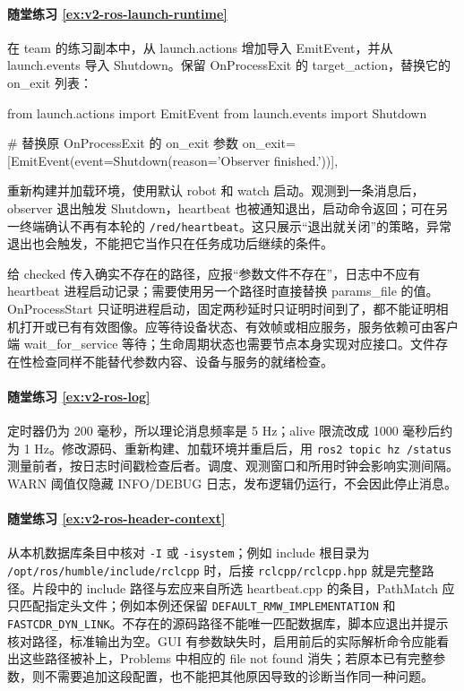 \paragraph*{随堂练习 \ref{ex:v2-ros-launch-runtime}}
\begin{solution}
在 team 的练习副本中，从 launch.actions 增加导入 EmitEvent，并从 launch.events 导入 Shutdown。保留 OnProcessExit 的 target\_action，替换它的 on\_exit 列表：
\begin{tpython}
from launch.actions import EmitEvent
from launch.events import Shutdown

# 替换原 OnProcessExit 的 on_exit 参数
on_exit=[EmitEvent(event=Shutdown(reason='Observer finished.'))],
\end{tpython}
重新构建并加载环境，使用默认 robot 和 watch 启动。观测到一条消息后，observer 退出触发 Shutdown，heartbeat 也被通知退出，启动命令返回；可在另一终端确认不再有本轮的 \texttt{/red/heartbeat}。这只展示“退出就关闭”的策略，异常退出也会触发，不能把它当作只在任务成功后继续的条件。

给 checked 传入确实不存在的路径，应报“参数文件不存在”，日志中不应有 heartbeat 进程启动记录；需要使用另一个路径时直接替换 params\_file 的值。OnProcessStart 只证明进程启动，固定两秒延时只证明时间到了，都不能证明相机打开或已有有效图像。应等待设备状态、有效帧或相应服务，服务依赖可由客户端 wait\_for\_service 等待；生命周期状态也需要节点本身实现对应接口。文件存在性检查同样不能替代参数内容、设备与服务的就绪检查。
\end{solution}

\paragraph*{随堂练习 \ref{ex:v2-ros-log}}
\begin{solution}
定时器仍为 200 毫秒，所以理论消息频率是 5 Hz；alive 限流改成 1000 毫秒后约为 1 Hz。修改源码、重新构建、加载环境并重启后，用 \texttt{ros2 topic hz /status} 测量前者，按日志时间戳检查后者。调度、观测窗口和所用时钟会影响实测间隔。WARN 阈值仅隐藏 INFO/DEBUG 日志，发布逻辑仍运行，不会因此停止消息。
\end{solution}

\paragraph*{随堂练习 \ref{ex:v2-ros-header-context}}
\begin{solution}
从本机数据库条目中核对 \texttt{-I} 或 \texttt{-isystem}；例如 include 根目录为 \nolinkurl{/opt/ros/humble/include/rclcpp} 时，后接 \nolinkurl{rclcpp/rclcpp.hpp} 就是完整路径。片段中的 include 路径与宏应来自所选 heartbeat.cpp 的条目，PathMatch 应只匹配指定头文件；例如本例还保留 \nolinkurl{DEFAULT_RMW_IMPLEMENTATION} 和 \nolinkurl{FASTCDR_DYN_LINK}。不存在的源码路径不能唯一匹配数据库，脚本应退出并提示核对路径，标准输出为空。GUI 有参数缺失时，启用前后的实际解析命令应能看出这些路径被补上，Problems 中相应的 file not found 消失；若原本已有完整参数，则不需要追加这段配置，也不能把其他原因导致的诊断当作同一种问题。
\end{solution}

